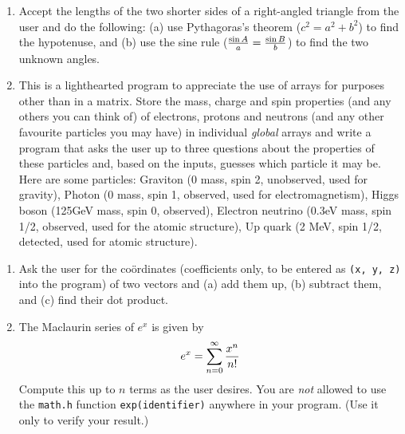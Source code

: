 \documentclass{article}
\begin{document}
\vspace{5ex}


\begin{enumerate}
\item Accept the lengths of the two shorter sides of a right-angled triangle from the user and do the following: (a) use Pythagoras's theorem ($c^2 = a^2 + b^2$) to find the hypotenuse, and (b) use the sine rule (${\sin A \over a} = {\sin B \over b}$) to find the two unknown angles.
\item This is a lighthearted program to appreciate the use of arrays for purposes other than in a matrix. Store the mass, charge and spin properties (and any others you can think of) of electrons, protons and neutrons (and any other favourite particles you may have) in individual \textit{global} arrays and write a program that asks the user up to three questions about the properties of these particles and, based on the inputs, guesses which particle it may be. Here are some particles: Graviton (0 mass, spin 2, unobserved, used for gravity), Photon (0 mass, spin 1, observed, used for electromagnetism), Higgs boson (125GeV mass, spin 0, observed), Electron neutrino (0.3eV mass, spin 1/2, observed, used for the atomic structure), Up quark (2 MeV, spin 1/2, detected, used for atomic structure).
\end{enumerate}
\vspace{5ex}

\pagebreak

\begin{enumerate}
\item Ask the user for the co\"{o}rdinates (coefficients only, to be entered as \verb+(x, y, z)+ into the program) of two vectors and (a) add them up, (b) subtract them, and (c) find their dot product.
\item The Maclaurin series of $e^x$ is given by $$e^x = \sum\displaylimits_{n=0}^\infty {x^n \over n!}$$Compute this up to $n$ terms as the user desires. You are \textit{not} allowed to use the \verb+math.h+ function \verb+exp(identifier)+ anywhere in your program. (Use it only to verify your result.)
\end{enumerate}
\vspace{5ex}
\end{document}
